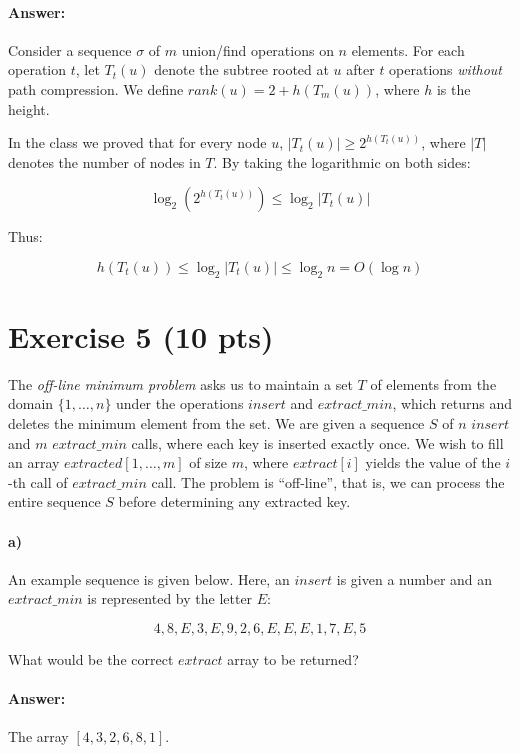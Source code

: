 \documentclass[a4paper]{article}
\begin{document}
\paragraph{Answer:}

Consider a sequence $\sigma$ of $m$ union/find operations on $n$ elements. For each operation $t$, let $T_t(u)$ denote the subtree rooted at $u$ after $t$ operations \emph{without} path compression. We define ${rank}(u) = 2 + h(T_m(u))$, where $h$ is the height.

In the class we proved that for every node $u$, $|T_t(u)| \ge 2^{h(T_t(u))}$, where $|T|$ denotes the number of nodes in $T$. By taking the logarithmic on both sides:

$$\log_2 (2^{h(T_t(u))}) \le \log_2 |T_t(u)|$$

Thus:

$$h(T_t(u)) \le \log_2 |T_t(u)| \le \log_2 n = O(\log n)$$


\section{Exercise 5 (10 pts)}

The \emph{off-line minimum problem} asks us to maintain a set $T$ of elements from the domain $\{1, \ldots, n\}$ under the operations $insert$ and $extract\_min$, which returns and deletes the minimum element from the set. We are given a sequence $S$ of $n$ $insert$ and $m$ $extract\_min$ calls, where each key is inserted exactly once. We wish to fill an array $extracted[1,\ldots, m]$ of size $m$, where $extract[i]$ yields the value of the $i$-th call of $extract\_min$ call. The problem is ``off-line'', that is, we can process the entire sequence $S$ before determining any extracted key.

\paragraph{a)} An example sequence is given below. Here, an $insert$ is given a number and an $extract\_min$ is represented by the letter $E$:

$$4,8,E,3,E,9,2,6,E,E,E,1,7,E,5$$

What would be the correct $extract$ array to be returned?

\paragraph{Answer:} The array $[4, 3, 2, 6, 8, 1]$.
\end{document}
